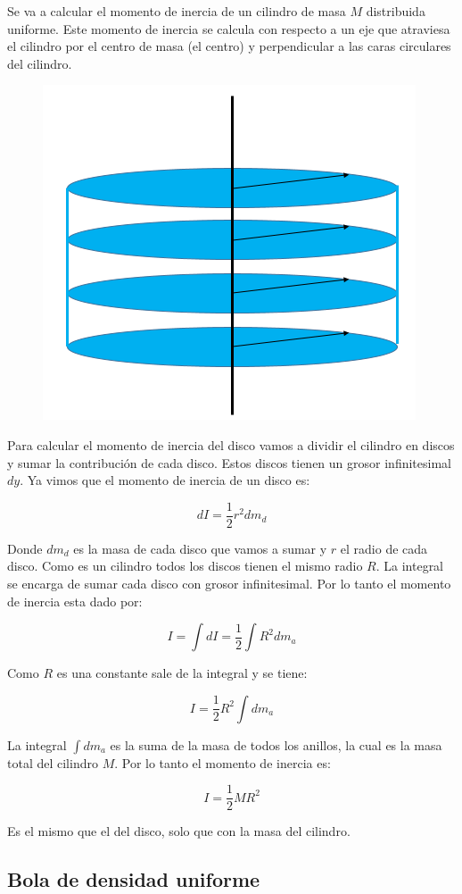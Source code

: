 \documentclass[a4paper,11pt]{article}
\theoremstyle{mytheor}
\begin{document}
Se va a calcular el momento de inercia de un cilindro de masa $M$ distribuida uniforme. Este momento de inercia se calcula con respecto a un eje que atraviesa el cilindro por el centro de masa (el centro) y perpendicular a las caras circulares del cilindro.



\begin{figure}[h]
	\includegraphics[width=0.5\linewidth]{cilindro2}
	\label{fcN4}
\end{figure}

Para calcular el momento de inercia del disco vamos a dividir el cilindro en discos y sumar la contribución de cada disco. Estos discos tienen un grosor infinitesimal $dy$. Ya vimos que el momento de inercia de un disco es:

$$ dI = \frac{1}{2} r^2 dm_d $$

Donde $dm_d$ es la masa de cada disco que vamos a sumar y $r$ el radio de cada disco. Como es un cilindro todos los discos tienen el mismo radio $R$. La integral se encarga de sumar cada disco con grosor infinitesimal. Por lo tanto el momento de inercia esta dado por:


$$ I = \int d I  = \frac{1}{2} \int R^2 dm_a $$

Como $R$ es una constante sale de la integral y se tiene:

$$ I = \frac{1}{2} R^2 \int dm_a$$

La integral $\int dm_a$ es la suma de la masa de todos los anillos, la cual es la masa total del cilindro $M$. Por lo tanto el momento de inercia es:

$$ I = \frac{1}{2} M R^2$$

Es el mismo que el del disco, solo que con la masa del cilindro. 


\subsection{Bola de densidad uniforme}
\end{document}
